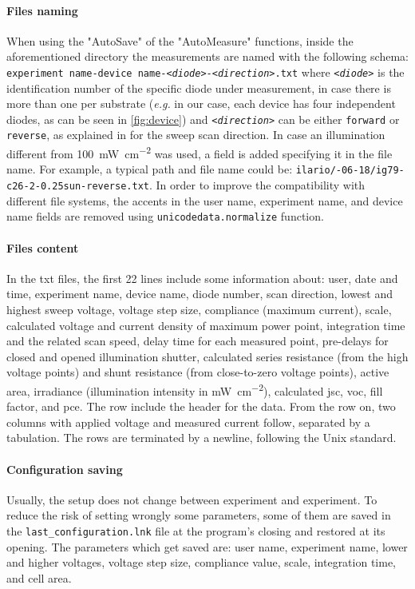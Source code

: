 \paragraph{Files naming}\label{pypv_naming_files}
When using the "AutoSave" of the "AutoMeasure" functions, inside the aforementioned directory the measurements are named with the following schema: \texttt{experiment name-device name-\textit{<diode>}-\textit{<direction>}.txt} where \textit{\texttt{<diode>}} is the identification number of the specific diode under measurement, in case there is more than one per substrate (\textsl{e.g.} in our case, each device has four independent diodes, as can be seen in \cref{fig:device}) and \texttt{\textit{<direction>}} can be either \texttt{forward} or \texttt{reverse}, as explained in  for the sweep scan direction.
In case an illumination different from \SI{100}{\mW\per\square\cm} was used, a field is added specifying it in the file name.
For example, a typical path and file name could be: \texttt{ilario/-06-18/\-ig79-c26-2-0.25sun-reverse.txt}.
In order to improve the compatibility with different file systems, the accents in the user name, experiment name, and device name fields are removed using \texttt{unicode\-data.\-normalize} function.

\paragraph{Files content}
In the txt files, the first 22 lines include some information about: user, date and time, experiment name, device name, diode number, scan direction, lowest and highest sweep voltage, voltage step size, compliance (maximum current), scale, calculated voltage and current density of maximum power point, integration time and the related scan speed, delay time for each measured point, pre-delays for closed and opened illumination shutter, calculated series resistance (from the high voltage points) and shunt resistance (from close\hyp{}to\hyp{}zero voltage points), active area, irradiance (illumination intensity in \si{\mW\per\square\cm}), calculated \gls{jsc}, \gls{voc}, fill factor, and \gls{pce}.
The  row include the header for the data.
From the  row on, two columns with applied voltage and measured current follow, separated by a tabulation.
The rows are terminated by a \texttt{\n} newline, following the Unix standard.

\paragraph{Configuration saving}
Usually, the setup does not change between experiment and experiment.
To reduce the risk of setting wrongly some parameters, some of them are saved in the \texttt{last\_configuration.lnk} file at the program's closing and restored at its opening.
The parameters which get saved are: user name, experiment name, lower and higher voltages, voltage step size, compliance value, scale, integration time, and cell area.


